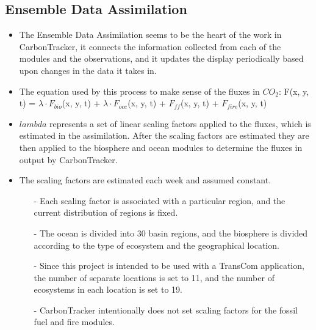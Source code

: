 \documentclass[12pt,letterpaper]{report}
\begin{document}
	\subsection*{Ensemble Data Assimilation}
	 \begin{itemize}
	 \item The Ensemble Data Assimilation seems to be the heart of the work in CarbonTracker, it connects the information collected from each of the modules and the observations, and it updates the display periodically based upon changes in the data it takes in.
	 \item The equation used by this process to make sense of the fluxes in $CO_2$:\newline
	 F(x, y, t) = $\lambda \cdot F_{bio}$(x, y, t) + $\lambda \cdot F_{oce}$(x, y, t) + $F_{ff}$(x, y, t) + $F_{fire}$(x, y, t)
	 \item $lambda$ represents a set of linear scaling factors applied to the fluxes, which is estimated in the assimilation.  After the scaling factors are estimated they are then applied to the biosphere and ocean modules to determine the fluxes in output by CarbonTracker.
	 \item The scaling factors are estimated each week and assumed constant.
	  \begin{itemize}
	  \item[-] Each scaling factor is associated with a particular region, and the current distribution of regions is fixed.  
     \item[-] The ocean is divided into 30 basin regions, and the biosphere is divided according to the type of ecosystem and the geographical location.  
     \item[-] Since this project is intended to be used with a TransCom application, the number of separate locations is set to 11, and the number of ecosystems in each location is set to 19.  
     \item[-] CarbonTracker intentionally does not set scaling factors for the fossil fuel and fire modules.
	  \end{itemize}
	 \end{itemize}
\end{document}
